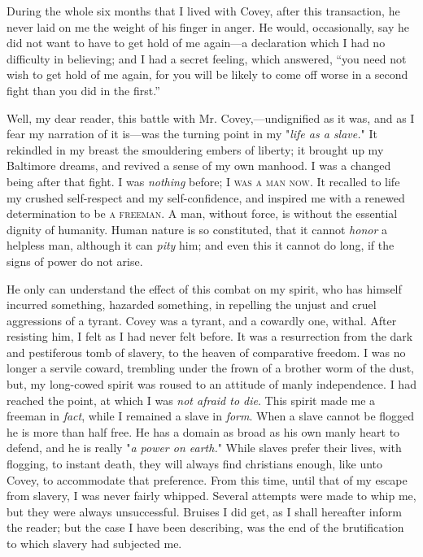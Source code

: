 During the whole six months that I lived with Covey, after this
transaction, he never laid on me the weight of his finger in anger. He
would, occasionally, say he did not want to have to get hold of me
again---a declaration which I had no difficulty in believing; and I had
a secret feeling, which answered, ``you need not wish to get hold of me
again, for you will be likely to come off worse in a second fight than
you did in the first.''

Well, my dear reader, this battle with Mr. Covey,---undignified as it
was, and as I fear my narration of it is---was the turning point in my
"\emph{life as a slave.}" It rekindled in my breast the smouldering
embers of liberty; it brought up my Baltimore dreams, and revived a
sense of my own manhood. I was a changed being after that fight. I was
\emph{nothing} before; I \textsc{was a man now}. It recalled to life my
crushed self-respect and my self-confidence, and inspired me with a
renewed determination to be \textsc{a freeman}. A man,
{\protect\hypertarget{247}{}{}}without force, is without the essential
dignity of humanity. Human nature is so constituted, that it cannot
\emph{honor} a helpless man, although it can \emph{pity} him; and even
this it cannot do long, if the signs of power do not arise.

He only can understand the effect of this combat on my spirit, who has
himself incurred something, hazarded something, in repelling the unjust
and cruel aggressions of a tyrant. Covey was a tyrant, and a cowardly
one, withal. After resisting him, I felt as I had never felt before. It
was a resurrection from the dark and pestiferous tomb of slavery, to the
heaven of comparative freedom. I was no longer a servile coward,
trembling under the frown of a brother worm of the dust, but, my
long-cowed spirit was roused to an attitude of manly independence. I had
reached the point, at which I was \emph{not afraid to die}. This spirit
made me a freeman in \emph{fact}, while I remained a slave in
\emph{form}. When a slave cannot be flogged he is more than half free.
He has a domain as broad as his own manly heart to defend, and he is
really "\emph{a power on earth.}" While slaves prefer their lives, with
flogging, to instant death, they will always find christians enough,
like unto Covey, to accommodate that preference. From this time, until
that of my escape from slavery, I was never fairly whipped. Several
attempts were made to whip me, but they were always unsuccessful.
Bruises I did get, as I shall hereafter inform the reader; but the case
I have been describing, was the end of the brutification to which
slavery had subjected me.

